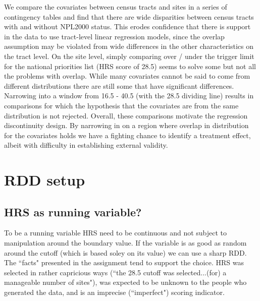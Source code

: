 \documentclass[letterpaper, 12pt]{article}
\begin{document}
We compare the covariates between census tracts and sites in a series of contingency tables and find that there are wide disparities between census tracts with and without NPL2000 status.  This erodes confidence that there is support in the data to use tract-level linear regression models, since the overlap assumption may be violated from wide differences in the other characteristics on the tract level.  On the site level, simply comparing over / under the trigger limit for the national priorities list (HRS score of 28.5) seems to solve some but not all the problems with overlap.  While many covariates cannot be said to come from different distributions there are still some that have significant differences.  Narrowing into a window from 16.5 - 40.5 (with the 28.5 dividing line) results in comparisons for which the hypothesis that the covariates are from the same distribution is not rejected.  Overall, these comparisons motivate the regression discontinuity design.  By narrowing in on a region where overlap in distribution for the covariates holds we have a fighting chance to identify a treatment effect, albeit with difficulty in establishing external validity.  





\section{RDD setup}

\subsection{HRS as running variable?}
To be a running variable HRS need to be continuous and not subject to manipulation around the boundary value.  If the variable is as good as random around the cutoff (which is based soley on its value) we can use a sharp RDD.  The ``facts" presented in the assignment tend to support the choice.  HRS was selected in rather capricious ways (``the 28.5 cutoff was selected...(for) a manageable number of sites"), was expected to be unknown to the people who generated the data, and is an imprecise (``imperfect") scoring indicator. 
\end{document}
